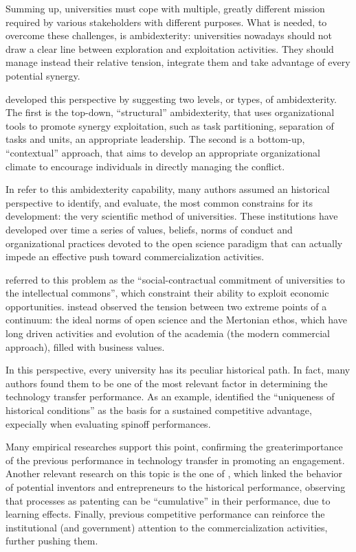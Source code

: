 Summing up, universities must cope with multiple, greatly different mission required by various stakeholders with different purposes. What is needed, to overcome these challenges, is ambidexterity: universities nowadays should not draw a clear line between exploration and exploitation activities. They should manage instead their relative tension, integrate them and take advantage of every potential synergy.

\citet{Chang2016} developed this perspective by suggesting two levels, or types, of ambidexterity. The first is the top-down, \enquote{structural} ambidexterity, that uses organizational tools to promote synergy exploitation, such as task partitioning, separation of tasks and units, an appropriate leadership. The second is a bottom-up, \enquote{contextual} approach, that aims to develop an appropriate organizational climate to encourage individuals in directly managing the conflict.

In refer to this ambidexterity capability, many authors assumed an historical perspective to identify, and evaluate, the most common constrains for its development: the very scientific method of universities. These institutions have developed over time a series of values, beliefs, norms of conduct and organizational practices devoted to the open science paradigm that can actually impede an effective push toward commercialization activities. 

\citet{Argyres1998} referred to this problem as the \enquote{social-contractual commitment of universities to the intellectual commons}, which constraint their ability to exploit economic opportunities. \citet{Muscio2013} instead observed the tension between two extreme points of a continuum: the ideal norms of open science and the Mertonian ethos, which have long driven activities and evolution of the academia (the modern commercial approach), filled with business values.

In this perspective, every university has its peculiar historical path. In fact, many authors found them to be one of the most relevant factor in determining the technology transfer performance. As an example, \citet{OShea2005} identified the \enquote{uniqueness of historical conditions} as the basis for a sustained competitive advantage, expecially when evaluating spinoff performances. 

Many empirical researches support this point, confirming the greaterimportance of the previous performance in technology transfer in promoting an engagement. Another relevant research on this topic is the one of \citet{Baldini2006}, which linked the behavior of potential inventors and entrepreneurs to the historical performance, observing that processes as patenting can be \enquote{cumulative} in their performance, due to learning effects. Finally, previous competitive performance can reinforce the institutional (and government) attention to the commercialization activities, further pushing them.

